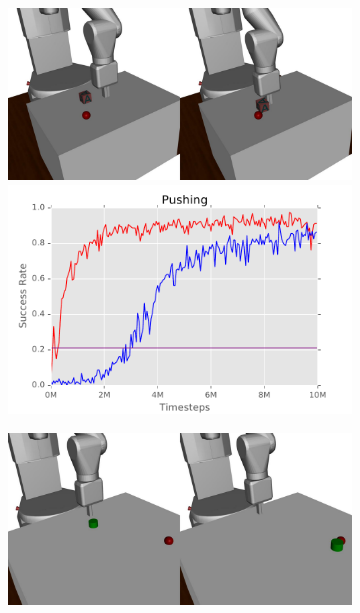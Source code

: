 \documentclass[letterpaper, 10 pt, conference]{ieeeconf}  %
\begin{document}
\begin{figure}[t]%
    \centering
    \vspace{6pt}
    \begin{subfigure}{0.3\linewidth}
        \centering
        \includegraphics[width=0.8\linewidth]{figs/combined_push}
        \includegraphics[width=1.0\linewidth]{figs/push}
    \end{subfigure}
    \begin{subfigure}{0.3\linewidth}
        \centering
        \includegraphics[width=0.8\linewidth]{figs/combined_kick}

\end{subfigure}
\end{figure}
\end{document}
